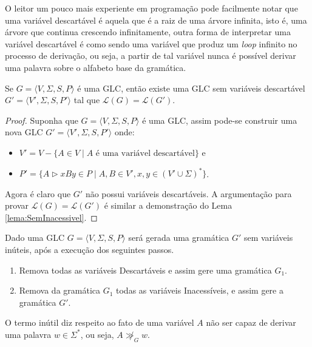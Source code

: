 O leitor um pouco mais experiente em programação pode facilmente notar que uma variável descartável é aquela que é a raiz de uma árvore infinita, isto é, uma árvore que continua crescendo infinitamente, outra forma de interpretar uma variável descartável é como sendo uma variável que produz um \textit{loop} infinito no processo de derivação, ou seja, a partir de tal variável nunca é possível derivar uma palavra sobre o alfabeto base da gramática.

\begin{lemma}\label{lema:SemDescartavel}
    Se $G = \langle V, \Sigma, S, P\rangle$ é uma GLC, então existe uma GLC sem variáveis descartável $G' = \langle V', \Sigma, S, P'\rangle$ tal que $\mathcal{L}(G) = \mathcal{L}(G')$.
\end{lemma}

\begin{proof}
    Suponha que $G = \langle V, \Sigma, S, P\rangle$ é uma GLC, assim pode-se construir uma nova GLC $G' = \langle V', \Sigma, S, P'\rangle$ onde: 
    \begin{itemize}
        \item $V' = V - \{A \in V \mid A \mbox{ é uma variável descartável}\}$ e
        \item $P' = \{A \rhd xBy \in P \mid A, B \in V', x, y \in (V' \cup \Sigma)^*\}$.
    \end{itemize}
    Agora é claro que $G'$ não possui variáveis descartáveis. A argumentação para provar $\mathcal{L}(G) = \mathcal{L}(G')$ é similar a demonstração do Lema \ref{lema:SemInacessivel}.
\end{proof}

\begin{definition}\label{def:RegraInuteis}
    Dado uma GLC $G = \langle V, \Sigma, S, P\rangle$ será gerada uma gramática $G'$ sem variáveis inúteis, após a execução dos seguintes passos.
    \begin{enumerate}
        \item Remova todas as variáveis Descartáveis e assim gere uma gramática $G_1$.
        \item Remova da gramática $G_1$ todas as variáveis Inacessíveis, e assim gere a gramática $G'$.
    \end{enumerate}
\end{definition}

O termo inútil diz respeito ao fato de uma variável $A$ não ser capaz de derivar uma palavra $w \in \Sigma^*$, ou seja, $A \not\gg_G w$.

